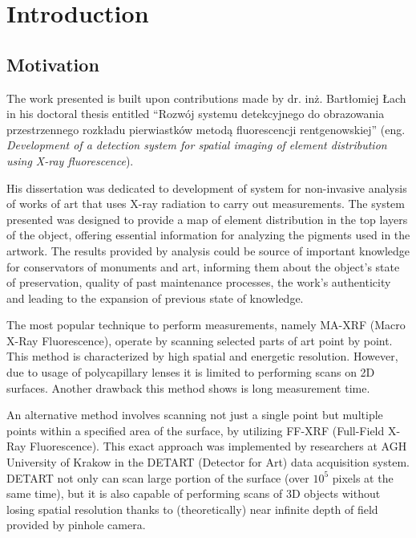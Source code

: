 \section{Introduction}
\subsection{Motivation}
The work presented is built upon contributions made by dr. inż. Bartłomiej Łach in his doctoral thesis entitled ``Rozwój systemu detekcyjnego do obrazowania przestrzennego rozkładu pierwiastków metodą fluorescencji rentgenowskiej'' \cite{Lach2022}  (eng. \emph{Development of a detection system for spatial imaging of element distribution using X-ray fluorescence}).

His dissertation was dedicated to development of system for non-invasive analysis of works of art that uses X-ray radiation to carry out measurements. 
The system presented was designed to provide a map of element distribution in the top layers of the object, offering essential information for analyzing the pigments used in the artwork. 
The results provided by analysis could be source of important knowledge for conservators of monuments and art, informing them about the object's state of preservation, quality of past maintenance processes, the work's authenticity and leading to the expansion of previous state of knowledge.

The most popular technique to perform measurements, namely MA-XRF (Macro X-Ray Fluorescence), operate by scanning selected parts of art point by point. 
This method is characterized by high spatial and energetic resolution. 
However, due to usage of polycapillary lenses it is limited to performing scans on 2D surfaces.
Another drawback this method shows is long measurement time. 

An alternative method involves scanning not just a single point but multiple points within a specified area of the surface, by utilizing FF-XRF (Full-Field X-Ray Fluorescence). 
This exact approach was implemented by researchers at AGH University of Krakow in the DETART (Detector for Art) data acquisition system. 
DETART not only can scan large portion of the surface (over $10^5$ pixels at the same time), but it is also capable of performing scans of 3D objects without losing spatial resolution thanks to (theoretically) near infinite depth of field provided by pinhole camera. 

